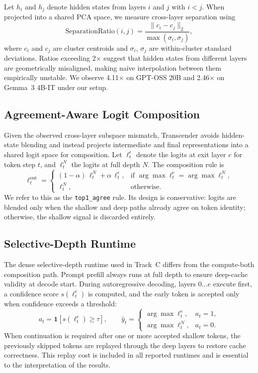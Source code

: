 \documentclass[11pt]{article}
\begin{document}
Let $h_i$ and $h_j$ denote hidden states from layers $i$ and $j$ with $i < j$. When projected into a shared PCA space, we measure cross-layer separation using
\begin{equation}
\mathrm{SeparationRatio}(i,j) =
\frac{\lVert c_i - c_j \rVert_2}{\max(\sigma_i,\sigma_j)},
\label{eq:separation}
\end{equation}
where $c_i$ and $c_j$ are cluster centroids and $\sigma_i$, $\sigma_j$ are within-cluster standard deviations. Ratios exceeding 2$\times$ suggest that hidden states from different layers are geometrically misaligned, making naive interpolation between them empirically unstable. We observe 4.11$\times$ on GPT-OSS 20B and 2.46$\times$ on Gemma~3 4B-IT under our setup.

\subsection{Agreement-Aware Logit Composition}

Given the observed cross-layer subspace mismatch, Transcender avoids hidden-state blending and instead projects intermediate and final representations into a shared logit space for composition. Let $\ell_t^e$ denote the logits at exit layer $e$ for token step $t$, and $\ell_t^N$ the logits at full depth $N$. The composition rule is
\begin{equation}
\ell_t^{\mathrm{out}} =
\begin{cases}
(1-\alpha)\,\ell_t^N + \alpha\,\ell_t^e, &
\text{if } \arg\max \ell_t^e = \arg\max \ell_t^N, \\
\ell_t^N, & \text{otherwise.}
\end{cases}
\label{eq:blend}
\end{equation}
We refer to this as the \texttt{top1\_agree} rule. Its design is conservative: logits are blended only when the shallow and deep paths already agree on token identity; otherwise, the shallow signal is discarded entirely.

\subsection{Selective-Depth Runtime}

The dense selective-depth runtime used in Track~C differs from the compute-both composition path. Prompt prefill always runs at full depth to ensure deep-cache validity at decode start. During autoregressive decoding, layers $0 \ldots e$ execute first, a confidence score $s(\ell_t^e)$ is computed, and the early token is accepted only when confidence exceeds a threshold:
\begin{equation}
a_t = \mathbf{1}[s(\ell_t^e) \ge \tau], \qquad
\hat{y}_t =
\begin{cases}
\arg\max \ell_t^e, & a_t = 1, \\
\arg\max \ell_t^N, & a_t = 0.
\end{cases}
\label{eq:selective}
\end{equation}
When continuation is required after one or more accepted shallow tokens, the previously skipped tokens are replayed through the deep layers to restore cache correctness. This replay cost is included in all reported runtimes and is essential to the interpretation of the results.
\end{document}
